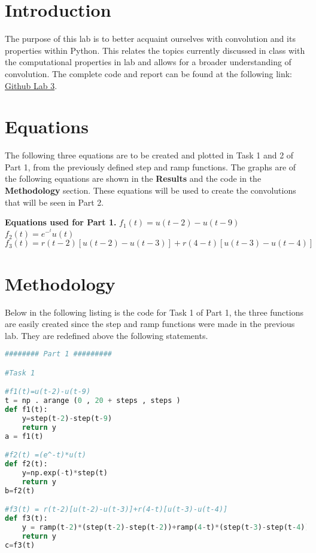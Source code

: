 \documentclass[12pt]{report}
\begin{document}
\section{Introduction}
 The purpose of this lab is to better acquaint ourselves with convolution and its properties within Python. This relates the topics currently discussed in class with the computational properties in lab and allows for a broader understanding of convolution. 
  The complete code and report can be found at the following link: \href{https://github.com/CDJohnson279}{Github Lab 3}. 

\section{Equations}

The following three equations are to be created and plotted in Task 1 and 2 of Part 1, from the previously defined step and ramp functions. The graphs are of the following equations are shown in the \textbf{Results} and the code in the \textbf{Methodology} section. These equations will be used to create the convolutions that will be seen in Part 2. 
\newline 

\textbf{Equations used for Part 1.}\newline 
$f_1(t) = u(t − 2) − u(t − 9)$\newline
$f_2(t) = e^-^tu(t)$\newline 
$f_3(t) = r(t − 2) [u(t − 2) − u(t − 3)] + r(4 − t) [u(t − 3) − u(t − 4)]$
 

\section{Methodology}
Below in the following listing is the code for Task 1 of Part 1, the three functions are easily created since the step and ramp functions were made in the previous lab. They are redefined above the following statements. 

\begin{lstlisting}[language=Python]
######## Part 1 #########

#Task 1 

#f1(t)=u(t-2)-u(t-9)
t = np . arange (0 , 20 + steps , steps )
def f1(t):
    y=step(t-2)-step(t-9)
    return y 
a = f1(t)

#f2(t) =(e^-t)*u(t)
def f2(t):
    y=np.exp(-t)*step(t)
    return y 
b=f2(t) 

#f3(t) = r(t-2)[u(t-2)-u(t-3)]+r(4-t)[u(t-3)-u(t-4)]
def f3(t):
    y = ramp(t-2)*(step(t-2)-step(t-2))+ramp(4-t)*(step(t-3)-step(t-4)) 
    return y 
c=f3(t)
\end{lstlisting}
\end{document}
